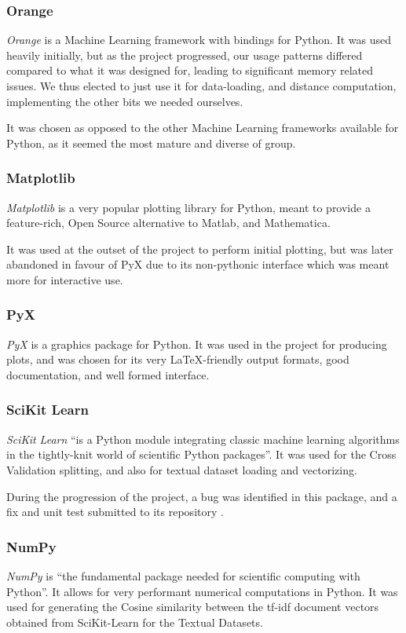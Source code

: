 \documentclass[a4paper,11pt]{report}
\begin{document}
\subsubsection*{Orange}
\emph{Orange} \citep{prog:orange} is a Machine Learning framework with bindings for Python. It was used heavily initially, but as the project progressed, our usage patterns differed compared to what it was designed for, leading to significant memory related issues. We thus elected to just use it for data-loading, and distance computation, implementing the other bits we needed ourselves.

It was chosen as opposed to the other Machine Learning frameworks available for Python, as it seemed the most mature and diverse of group.

\subsubsection*{Matplotlib}
\emph{Matplotlib} \citep{prog:matplotlib} is a very popular plotting library for Python, meant to provide a feature-rich, Open Source alternative to Matlab, and Mathematica.

It was used at the outset of the project to perform initial plotting, but was later abandoned in favour of PyX due to its non-pythonic interface which was meant more for interactive use.

\subsubsection*{PyX}
\emph{PyX} \citep{prog:pyx} is a graphics package for Python. It was used in the project for producing plots, and was chosen for its very \LaTeX{}-friendly output formats, good documentation, and well formed interface.

\subsubsection*{SciKit Learn}
\emph{SciKit Learn} \citep{prog:sklearn} ``is a Python module integrating classic machine learning algorithms in the tightly-knit world of scientific Python packages''. It was used for the Cross Validation splitting, and also for textual dataset loading and vectorizing.

During the progression of the project, a bug was identified in this package, and a fix and unit test submitted to its repository \citep{web:scikitpullreq}.

\subsubsection*{NumPy}
\emph{NumPy} \citep{prog:numpy} is ``the fundamental package needed for scientific computing with Python''. It allows for very performant numerical computations in Python. It was used for generating the Cosine similarity between the tf-idf document vectors obtained from SciKit-Learn for the Textual Datasets.
 
\end{document}

